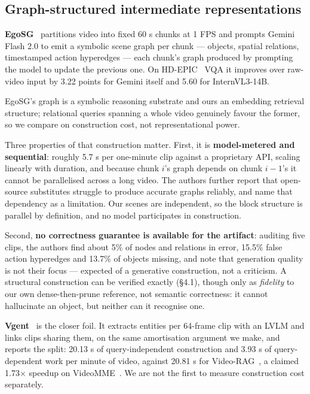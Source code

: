 \documentclass[sigconf,review,anonymous]{acmart}
\begin{document}
\subsection{Graph-structured intermediate representations}

\textbf{EgoSG}~\cite{taluzzi2026egosg} partitions video into fixed 60 s chunks at 1 FPS and prompts
Gemini Flash 2.0 to emit a symbolic scene graph per chunk --- objects, spatial relations,
timestamped action hyperedges --- each chunk's graph produced by prompting the model to update
the previous one. On HD-EPIC~\cite{perrett2025hdepic} VQA it improves over raw-video input by 3.22 points for Gemini
itself and 5.60 for InternVL3-14B.

EgoSG's graph is a symbolic reasoning substrate and ours an embedding retrieval structure;
relational queries spanning a whole video genuinely favour the former, so we compare on
construction cost, not representational power.

Three properties of that construction matter. First, it is \textbf{model-metered and sequential}:
roughly 5.7 s per one-minute clip against a proprietary API, scaling linearly with duration,
and because chunk \(i\)'s graph depends on chunk \(i-1\)'s it cannot be parallelised across a
long video. The authors further report that open-source substitutes struggle to produce
accurate graphs reliably, and name that dependency as a limitation. Our scenes are
independent, so the block structure is parallel by definition, and no model participates in
construction.

Second, \textbf{no correctness guarantee is available for the artifact}: auditing five clips,
the authors find about 5\% of nodes and relations in error, 15.5\% false action hyperedges and
13.7\% of objects missing, and note that generation quality is not their focus --- expected of
a generative construction, not a criticism. A structural construction can be verified exactly
(§4.1), though only as \emph{fidelity} to our own dense-then-prune reference, not semantic
correctness: it cannot hallucinate an object, but neither can it recognise one.

\textbf{Vgent}~\cite{shen2025vgent} is the closer foil. It extracts entities per 64-frame clip with an LVLM and
links clips sharing them, on the same amortisation argument we make, and reports the split:
20.13 s of query-independent construction and 3.93 s of query-dependent work per minute of
video, against 20.81 s for Video-RAG~\cite{luo2024videorag}, a claimed 1.73\ensuremath{\times} speedup on VideoMME~\cite{fu2025videomme}. We are
not the first to measure construction cost separately.
\end{document}
